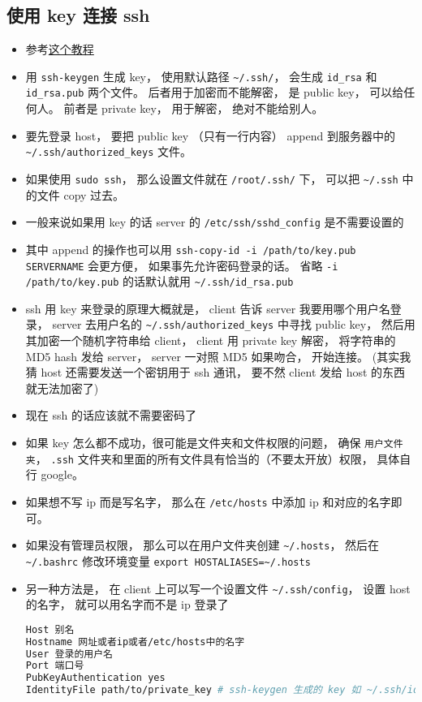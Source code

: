 \subsection{使用 key 连接 ssh}
\begin{itemize}
\item 参考\href{https://www.digitalocean.com/community/tutorials/ssh-essentials-working-with-ssh-servers-clients-and-keys}{这个教程}
\item 用 \verb`ssh-keygen` 生成 key， 使用默认路径 \verb`~/.ssh/`， 会生成 \verb`id_rsa` 和 \verb`id_rsa.pub` 两个文件。 后者用于加密而不能解密， 是 public key， 可以给任何人。 前者是 private key， 用于解密， 绝对不能给别人。
\item 要先登录 host， 要把 public key （只有一行内容） append 到服务器中的 \verb`~/.ssh/authorized_keys` 文件。
\item 如果使用 \verb`sudo ssh`， 那么设置文件就在 \verb`/root/.ssh/` 下， 可以把 \verb`~/.ssh` 中的文件 copy 过去。
\item 一般来说如果用 key 的话 server 的 \verb`/etc/ssh/sshd_config` 是不需要设置的
\item 其中 append 的操作也可以用 \verb`ssh-copy-id -i /path/to/key.pub SERVERNAME` 会更方便， 如果事先允许密码登录的话。 省略 \verb`-i /path/to/key.pub` 的话默认就用 \verb`~/.ssh/id_rsa.pub`
\item ssh 用 key 来登录的原理大概就是， client 告诉 server 我要用哪个用户名登录， server 去用户名的 \verb`~/.ssh/authorized_keys` 中寻找 public key， 然后用其加密一个随机字符串给 client， client 用 private key 解密， 将字符串的 MD5 hash 发给 server， server 一对照 MD5 如果吻合， 开始连接。  (其实我猜 host 还需要发送一个密钥用于 ssh 通讯， 要不然 client 发给 host 的东西就无法加密了)
\item 现在 ssh 的话应该就不需要密码了
\item 如果 key 怎么都不成功，很可能是文件夹和文件权限的问题， 确保 \verb`用户文件夹`， \verb`.ssh` 文件夹和里面的所有文件具有恰当的（不要太开放）权限， 具体自行 google。
\item 如果想不写 ip 而是写名字， 那么在 \verb`/etc/hosts` 中添加 ip 和对应的名字即可。
\item 如果没有管理员权限， 那么可以在用户文件夹创建 \verb`~/.hosts`， 然后在 \verb`~/.bashrc` 修改环境变量 \verb`export HOSTALIASES=~/.hosts`
\item 另一种方法是， 在 client 上可以写一个设置文件 \verb`~/.ssh/config`， 设置 host 的名字， 就可以用名字而不是 ip 登录了
\begin{lstlisting}[language=bash]
Host 别名
Hostname 网址或者ip或者/etc/hosts中的名字
User 登录的用户名
Port 端口号
PubKeyAuthentication yes
IdentityFile path/to/private_key # ssh-keygen 生成的 key 如 ~/.ssh/id_rsa


\end{lstlisting}
\end{itemize}
